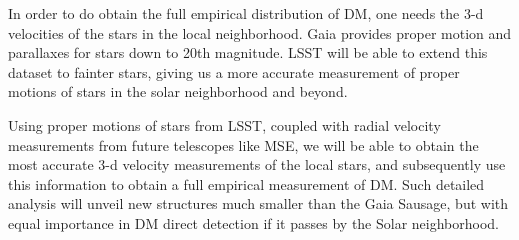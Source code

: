 In order to do obtain the full empirical distribution of DM, one needs the 3-d velocities of the stars in the local neighborhood. Gaia provides proper motion and parallaxes for stars down to 20th magnitude. LSST will be able to extend this dataset to fainter stars, giving us a more accurate measurement of proper motions of stars in the solar neighborhood and beyond.

 Using proper motions of stars from LSST, coupled with radial velocity measurements from future telescopes like MSE, we will be able to obtain the most accurate 3-d velocity measurements of the local stars, and subsequently use this information to obtain a full empirical measurement of DM. Such detailed analysis will unveil new structures much smaller than the Gaia Sausage, but with equal importance in DM direct detection if it passes by the Solar neighborhood.
